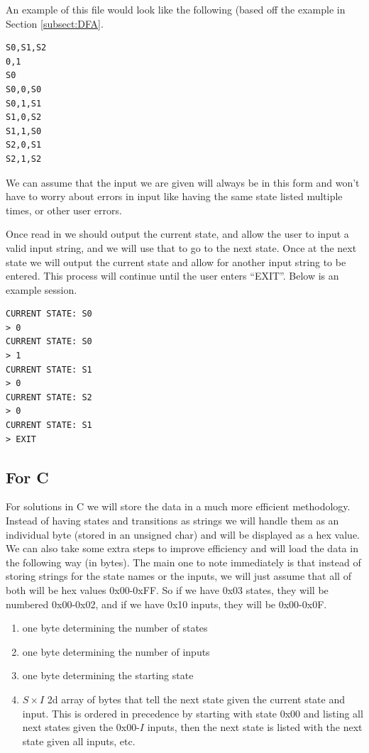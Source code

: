 \documentclass{article}
\begin{document}
An example of this file would look like the following (based off the example in Section \ref{subsect:DFA}.

\begin{verbatim}
S0,S1,S2
0,1
S0
S0,0,S0
S0,1,S1
S1,0,S2
S1,1,S0
S2,0,S1
S2,1,S2
\end{verbatim}

We can assume that the input we are given will always be in this form and won't have to worry about errors in input like having the same state listed multiple times, or other user errors.

Once read in we should output the current state, and allow the user to input a valid input string, and we will use that to go to the next state. Once at the next state we will output the current state and allow for another input string to be entered. This process will continue until the user enters ``EXIT''. Below is an example session.

\begin{verbatim}
CURRENT STATE: S0
> 0
CURRENT STATE: S0
> 1
CURRENT STATE: S1
> 0
CURRENT STATE: S2
> 0
CURRENT STATE: S1
> EXIT
\end{verbatim}

\subsection{For C}
For solutions in C we will store the data in a much more efficient methodology. Instead of having states and transitions as strings we will handle them as an individual byte (stored in an unsigned char) and will be displayed as a hex value. We can also take some extra steps to improve efficiency and will load the data in the following way (in bytes). The main one to note immediately is that instead of storing strings for the state names or the inputs, we will just assume that all of both will be hex values 0x00-0xFF. So if we have 0x03 states, they will be numbered 0x00-0x02, and if we have 0x10 inputs, they will be 0x00-0x0F.

\begin{enumerate}
\item one byte determining the number of states
\item one byte determining the number of inputs
\item one byte determining the starting state
\item $S \times I$ 2d array of bytes that tell the next state given the current state and input. This is ordered in precedence by starting with state 0x00 and listing all next states given the 0x00-$I$ inputs, then the next state is listed with the next state given all inputs, etc.
\end{enumerate}
\end{document}
